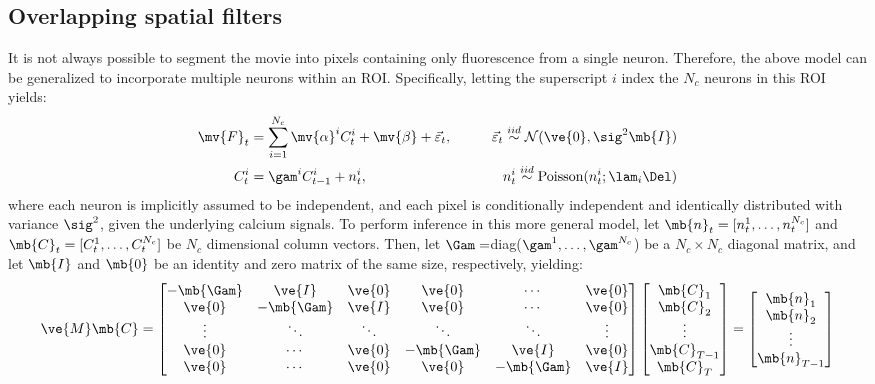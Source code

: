 \subsection{Overlapping spatial filters} \label{sec:methods:overlapping}

It is not always possible to segment the movie into pixels containing only fluorescence from a single neuron.  Therefore, the above model can be generalized to incorporate multiple neurons within an ROI.   Specifically, letting the superscript $i$ index the $N_c$ neurons in this ROI yields:  
\begin{align} \label{eq:overlapping}
\mv{F}_t &= \sum_{i=1}^{N_c}\mv{\alpha}^i C^i_t + \mv{\beta} +  \vec{\varepsilon}_t, \qquad &\vec{\varepsilon}_t \overset{iid}{\sim} \mathcal{N}(\ve{0}, \sig^2\mb{I})   \\
C^i_t &= \gam^i C^i_{t-1} + n^i_t, & n^i_t \overset{iid}{\sim} \text{Poisson}(n^i_t; \lam_i \Del)
\end{align}
\noindent where each neuron is implicitly assumed to be independent, and each pixel is conditionally independent and identically distributed with variance $\sig^2$, given the underlying calcium signals.  To perform inference in this more general model, let $\mb{n}_t=[n^1_t, \ldots, n^{N_c}_t]$ and $\mb{C}_t=[C^1_t, \ldots, C^{N_c}_t]$ be $N_c$ dimensional column vectors.  Then, let $\Gam=$diag($\gam^1,\ldots,\gam^{N_c}$) be a $N_c \times N_c$ diagonal matrix, and let $\mb{I}$ and $\mb{0}$ be an identity and zero matrix of the same size, respectively, yielding:
\begin{align} \label{eq:M2}
\ve{M} \mb{C} = %
\begin{bmatrix}
-\mb{\Gam} & \ve{I} & \ve{0} & \ve{0} & \cdots & \ve{0} \\
\ve{0} & -\mb{\Gam} & \ve{I} & \ve{0} & \cdots  & \ve{0} \\
\vdots & \ddots & \ddots & \ddots & \ddots & \vdots  \\
\ve{0} & \cdots & \ve{0}  & -\mb{\Gam} & \ve{I} & \ve{0} \\
\ve{0} & \cdots & \ve{0} & \ve{0} & -\mb{\Gam} & \ve{I}
\end{bmatrix}
\begin{bmatrix}
\mb{C}_1 \\ \mb{C}_2  \\  \vdots \\ \mb{C}_{T-1} \\ \mb{C}_T  
\end{bmatrix}
= 
\begin{bmatrix}
\mb{n}_1 \\ \mb{n}_2 \\ \vdots \\ \mb{n}_{T-1}
\end{bmatrix}
\end{align}
